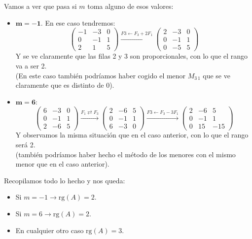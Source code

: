 \documentclass[a4paper,11pt,answers]{exam}
\newcommand\rango[1]{\mathrm{rg}(#1)}
\begin{document}
\begin{questions}
\begin{solution}
	Vamos a ver que pasa si $m$ toma alguno de esos valores:\\
	\begin{itemize}
		\item $\boldsymbol{m=-1}$. En ese caso tendremos:
		\[\left(\begin{array}{rrr}
			-1&-3&0\\
			0&-1&1\\
			2&1&5
		\end{array}\right) \xrightarrow{F3 \leftarrow F_3 + 2F_1} \left(\begin{array}{rrr}
		2&-3&0\\
		0&-1&1\\
		0&-5&5
	\end{array}\right)\]
	Y se ve claramente que las filas 2 y 3 son proporcionales, con lo que el rango va a ser 2.\\
	(En este caso también podríamos haber cogido el menor $M_{3\,1}$ que se ve claramente que es distinto de 0).
	\item $\boldsymbol{m = 6}$:
	\[\left(\begin{array}{rrr}
		6&-3&0\\
		0&-1&1\\
		2&-6&5
	\end{array}\right) \xrightarrow{F_1 \rightleftarrows F_3} \left(\begin{array}{rrr}
	2&-6&5\\
	0&-1&1\\
	6&-3&0
	\end{array}\right) \xrightarrow{F3 \leftarrow F_3 - 3F_1} \left(\begin{array}{rrr}
	2&-6&5\\
	0&-1&1\\
	0&15&-15
	\end{array}\right)\]
	Y observamos la misma situación que en el caso anterior, con lo que el rango será 2.\\
	(también podríamos haber hecho el método de los menores con el mismo menor que en el caso anterior).
	\end{itemize}

Recopilamos todo lo hecho y nos queda:
\begin{itemize}
	\item Si $m = -1 \rightarrow \rango{A} = 2$.
	\item Si $m = 6 \rightarrow \rango{A} = 2$.
	\item En cualquier otro caso $\rango{A} = 3$.
\end{itemize}
\end{solution}
\end{questions}
\end{document}
